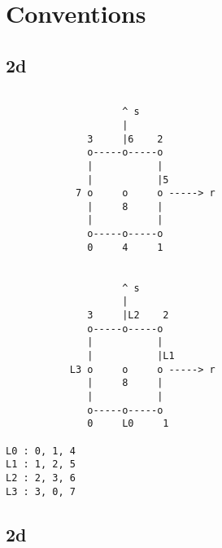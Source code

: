 \chapter{Conventions}



\section{2d}

\begin{verbatim}

                    ^ s
                    |
              3     |6    2
              o-----o-----o
              |           |
              |           |5
            7 o     o     o -----> r
              |     8     |
              |           |
              o-----o-----o
              0     4     1


                    ^ s
                    |
              3     |L2    2
              o-----o-----o
              |           |
              |           |L1
           L3 o     o     o -----> r
              |     8     |
              |           |
              o-----o-----o
              0     L0     1

L0 : 0, 1, 4
L1 : 1, 2, 5
L2 : 2, 3, 6
L3 : 3, 0, 7
\end{verbatim}





\section{2d}

